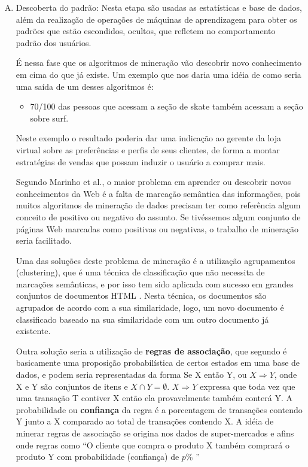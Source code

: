 \begin{enumerate}[A)]
\item Descoberta do padrão:
	Nesta etapa são usadas as estatísticas e base de dados, além da realização de operações de máquinas de aprendizagem para obter os padrões que estão escondidos, ocultos, que refletem no comportamento padrão dos usuários.

    É nessa fase que os algoritmos de mineração vão descobrir novo conhecimento em cima do que já existe. Um exemplo que nos daria uma idéia de como seria uma saída de um desses algoritmos é:
    \begin{itemize}
    \item 70/100 das pessoas que acessam a seção de skate também acessam a seção sobre surf.
    \end{itemize}
    Neste exemplo o resultado poderia dar uma indicação ao gerente da loja virtual sobre as preferências e perfis de seus clientes, de forma a montar estratégias de vendas que possam induzir o usuário a comprar mais.

    Segundo Marinho et al.\cite{Girardi}, o maior problema em aprender ou descobrir novos conhecimentos da Web é a falta de marcação semântica das informações, pois muitos algoritmos de mineração de dados precisam ter como referência algum conceito de positivo ou negativo do assunto. Se tivéssemos algum conjunto de páginas Web marcadas como positivas ou negativas, o trabalho de mineração seria facilitado.

    Uma das soluções deste problema de mineração é a utilização agrupamentos (clustering), que é uma técnica de classificação que não necessita de marcações semânticas, e por isso tem sido aplicada com sucesso em grandes conjuntos de documentos HTML \cite{Cutting}. Nesta técnica, os documentos são agrupados de acordo com a sua similaridade, logo, um novo documento é classificado baseado na sua similaridade com um outro documento já existente.

    Outra solução seria a utilização de \textbf{regras de associação}, que segundo \cite{Castano} é basicamente uma proposição probabilística de certos estados em uma base de dados, e podem seria representadas da forma Se X então Y, ou $ X \Rightarrow Y$, onde X e Y são conjuntos de itens e $X \cap Y = \emptyset$. $ X \Rightarrow Y$ expressa que toda vez que uma transação T contiver X então ela provavelmente também conterá Y. A probabilidade ou \textbf{confiança} da regra é a porcentagem de transações contendo Y junto a X comparado ao total de transações contendo X. A idéia de minerar regras de associação se origina nos dados de super-mercados e afins onde regras como “O cliente que compra o produto X também comprará o produto Y com probabilidade (confiança) de $p$\% ”\cite{Pal}


\end{enumerate}
